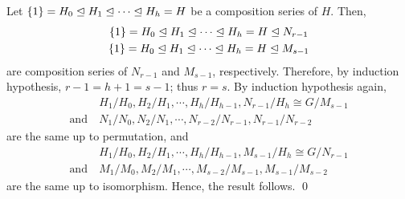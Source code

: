 \documentclass[../modern_algebra.tex]{subfiles}
\begin{document}
{\begin{enumerate}[nolistsep, label=(\roman*), leftmargin=*, listparindent=\parindent]
    Let \(\{1\} = H_0 \trianglelefteq H_1 \trianglelefteq \cdots \trianglelefteq H_h = H\)
    be a composition series of \(H\). Then,
    \begin{gather*}
        \{1\} = H_0 \trianglelefteq H_1 \trianglelefteq \cdots \trianglelefteq H_h = H \trianglelefteq N_{r-1} \\
        \{1\} = H_0 \trianglelefteq H_1 \trianglelefteq \cdots \trianglelefteq H_h = H \trianglelefteq M_{s-1}
    \end{gather*}
    are composition series of \(N_{r-1}\) and \(M_{s-1}\), respectively.
    Therefore, by induction hypothesis, \(r - 1 = h + 1 = s - 1\); thus \(r = s\).
    By induction hypothesis again,
    \begin{align*}
        & H_1/H_0, H_2/H_1, \cdots, H_h/H_{h-1}, N_{r-1}/H_h \cong G/M_{s-1} \\
        \text{and}~& N_1/N_0, N_2/N_1, \cdots, N_{r-2}/N_{r-1}, N_{r-1}/N_{r-2}
    \end{align*}
    are the same up to permutation, and
    \begin{align*}
        & H_1/H_0, H_2/H_1, \cdots, H_h/H_{h-1}, M_{s-1}/H_h \cong G/N_{r-1} \\
        \text{and}~& M_1/M_0, M_2/M_1, \cdots, M_{s-2}/M_{s-1}, M_{s-1}/M_{s-2}
    \end{align*}
    are the same up to isomorphism.
    Hence, the result follows.
    \qed
\end{enumerate}
}

\end{document}
